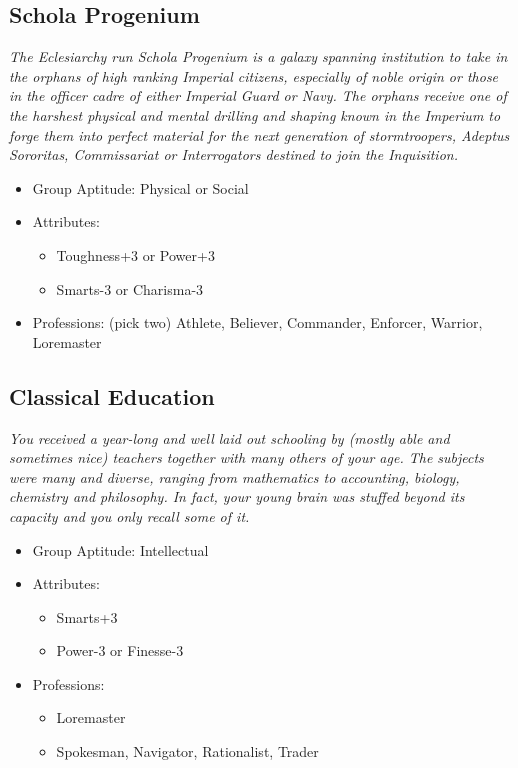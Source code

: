 	\subsection{Schola Progenium}
	\textit{The Eclesiarchy run Schola Progenium is a galaxy spanning institution to take in the orphans of high ranking Imperial citizens, especially of noble origin or those in the officer cadre of either Imperial Guard or Navy. The orphans receive one of the harshest physical and mental drilling and shaping known in the Imperium to forge them into perfect material for the next generation of stormtroopers, Adeptus Sororitas, Commissariat or Interrogators destined to join the Inquisition.}
	\begin{itemize}
		\item Group Aptitude: Physical or Social
		\item Attributes:
		\begin{itemize}
			\item Toughness+3 or Power+3
			\item Smarts-3 or Charisma-3
		\end{itemize}
		\item Professions: (pick two) Athlete, Believer, Commander, Enforcer, Warrior, Loremaster

	\end{itemize}

	\subsection{Classical Education}
	\textit{You received a year-long and well laid out schooling by (mostly able and sometimes nice) teachers together with many others of your age. The subjects were many and diverse, ranging from mathematics to accounting, biology, chemistry and philosophy. In fact, your young brain was stuffed beyond its capacity and you only recall some of it.}
	\begin{itemize}
		\item Group Aptitude: Intellectual
		\item Attributes:
		\begin{itemize}
			\item Smarts+3
			\item Power-3 or Finesse-3
		\end{itemize}
		\item Professions:
		\begin{itemize}
			\item Loremaster
			\item Spokesman, Navigator, Rationalist, Trader
		\end{itemize}
	\end{itemize}

